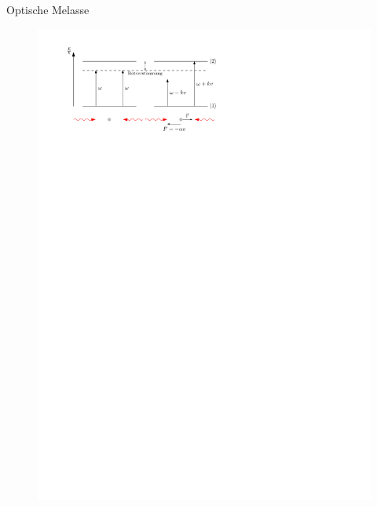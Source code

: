 \documentclass[12pt,xcolor=dvipsnames]{beamer}
\begin{document}
\begin{frame}{Optische Melasse}
\begin{figure}[h]
	\centering
	\includegraphics[width=\textwidth]{./figures/melasse.pdf}
\end{figure}
\end{frame}
\end{document}
